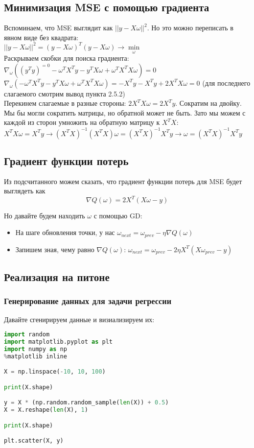 \documentclass{article}
\theoremstyle{problemstyle}
\theoremstyle{ans}
\begin{document}
\subsection{Минимизация MSE с помощью градиента}
Вспоминаем, что MSE выглядит как $||y - X\omega||^2$. Но это можно переписать в явном виде без квадрата:\\
$||y - X\omega||^2 = (y - X\omega)^T (y - X\omega) \to \min\limits_{\omega}$\\
Раскрываем скобки для поиска градиента: $\nabla_\omega ((y^Ty)^{= 0} - \omega^T X^T y - y^T X \omega + \omega^T X^T X \omega) = 0$\\
$\nabla_\omega ( - \omega^T X^T y - y^T X\omega + \omega^T X^T X \omega) = -X^T y - X^Ty + 2 X^T X \omega = 0$ (для последнего слагаемого смотрим вывод пункта 2.5.2)\\
Перекинем слагаемые в разные стороны: $2 X^T X \omega = 2 X^T y$. Сократим на двойку. Мы бы могли сократить матрицы, но обратной может не быть. Зато мы можем с каждой из сторон умножить на обратную матрицу к $X^T X$:\\
$X^T X \omega = X^T y \to (X^T X)^{-1}(X^T X) \omega = (X^T X)^{-1}X^T y \to \omega = (X^T X)^{-1}X^T y$

\subsection{Градиент функции потерь}
Из подсчитанного можем сказать, что градиент функции потерь для MSE будет выглядеть как 
$$\nabla Q(\omega) = 2X^T (X \omega - y)$$

Но давайте будем находить $\omega$ с помощью GD: 
\begin{itemize}
    \item На шаге обновления точки, у нас $\omega_{next} = \omega_{prev} - \eta \nabla Q(\omega)$
    \item Запишем зная, чему равно $\nabla Q(\omega)$: $\omega_{next} = \omega_{prev} - 2\eta X^T(X\omega_{prev} - y)$
\end{itemize}

\subsection{Реализация на питоне}
\subsubsection{Генерирование данных для задачи регрессии}
Давайте сгенирируем данные и визиализируем их:
\begin{lstlisting}[language=python]
import random
import matplotlib.pyplot as plt
import numpy as np
%matplotlib inline

X = np.linspace(-10, 10, 100)

print(X.shape)

y = X * (np.random.random_sample(len(X)) + 0.5)
X = X.reshape(len(X), 1)

print(X.shape)

plt.scatter(X, y)
\end{lstlisting}
\end{document}
